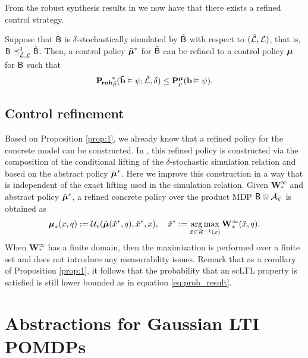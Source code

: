 \documentclass{ifacconf}
\begin{document}
From the robust synthesis results in \citep{tech_report_TACAS}
we now have that there exists a refined control strategy.\begin{prop}\label{prop:1}
  Suppose that $\mathsf{B}$ is $\delta$-stochastically simulated by $\tilde {\mathsf{B}}$ with respect to $({\tilde{\mathcal{L}},\mathcal{L}})$, that is, ${\mathsf{B}}\preceq^{\delta}_{\tilde{\mathcal{L}},\mathcal{L}} \tilde {\mathsf{B}}$. Then, a control policy ${\tilde {{\boldsymbol{\mu}}}}^\ast$ for $\tilde {\mathsf{B}}$ can be refined to a control policy ${\boldsymbol{\mu}}$ for $\mathsf{B}$ such that %
  \begin{equation}
  \label{eq:prob_result}
    \mathbf{P_{\! rob}}_{\tilde {\rho}}^{\!\ast}(\mathbf{\tilde b} \vDash\psi; \tilde{\mathcal{L}},\delta)\leq  \mathbf P _{\rho}^{{\boldsymbol{\mu}}}( \mathbf{b} \vDash\psi).
  \end{equation}
\end{prop}



\subsection{Control refinement}
\label{sec:control}

Based on Proposition \ref{prop:1}, we already know that a refined policy for the concrete model can be constructed. In \cite{tech_report_TACAS}, this refined policy is constructed via the composition of the conditional lifting of the $\delta$-stochastic simulation relation and based on the abstract policy $\tilde  {{\boldsymbol{\mu}}}^\ast$. Here we improve this construction in a way that is independent of the exact lifting used in the simulation relation. Given $\mathbf{W}^\infty_\ast$ and abstract policy $\tilde {{\boldsymbol{\mu}}}^\ast$, a refined concrete policy over the product MDP $\mathsf{B}\otimes\mathcal{A}_\psi$ is obtained as
\begin{equation*}
		{\boldsymbol{\mu}}_\ast(x,q): = \mathcal{U}_{v}( \tilde{{\boldsymbol{\mu}}}(\tilde x^*, q), \tilde x^*, x), \quad \tilde x^*:=\operatorname*{arg\,max}_{ \tilde x\in
		\mathcal{R}^{-1}(x)} \mathbf  W^\infty_\ast(\tilde x,q).
\end{equation*}
When  $\mathbf  W^\infty_\ast$ has a finite domain, then the maximization is performed over a finite set and does not introduce any measurability issues.
Remark that as a corollary of Proposition \ref{prop:1}, it follows that the probability that an scLTL property is satisfied is still lower bounded as in equation \eqref{eq:prob_result}.


\section{Abstractions for Gaussian LTI POMDPs}
\label{sec:gaussian}
\end{document}
